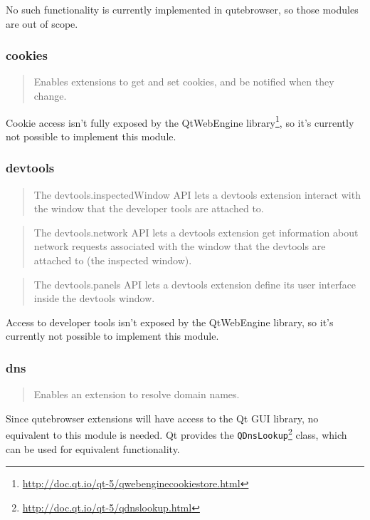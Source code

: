 \documentclass[a4paper,parskip=full,DIV=14,BCOR=15mm]{scrreprt}
\begin{document}
No such functionality is currently implemented in qutebrowser, so those modules
are out of scope.

\subsubsection{cookies}
\begin{quote}
Enables extensions to get and set cookies, and be notified when they change.
\end{quote}

Cookie access isn't fully exposed by the QtWebEngine
library\footnote{\url{http://doc.qt.io/qt-5/qwebenginecookiestore.html}}, so
it's currently not possible to implement this module.

\subsubsection{devtools}
\begin{quote}
The devtools.inspectedWindow API lets a devtools extension interact with the window that the developer tools are attached to.
\end{quote}

\begin{quote}
The devtools.network API lets a devtools extension get information about network requests associated with the window that the devtools are attached to (the inspected window).
\end{quote}

\begin{quote}
The devtools.panels API lets a devtools extension define its user interface inside the devtools window.
\end{quote}

Access to developer tools isn't exposed by the QtWebEngine library, so it's
currently not possible to implement this module.

\subsubsection{dns}
\begin{quote}
Enables an extension to resolve domain names.
\end{quote}

Since qutebrowser extensions will have access to the Qt GUI library, no
equivalent to this module is needed. Qt provides the
\verb|QDnsLookup|\footnote{\url{http://doc.qt.io/qt-5/qdnslookup.html}} class, which can
be used for equivalent functionality.
\end{document}
